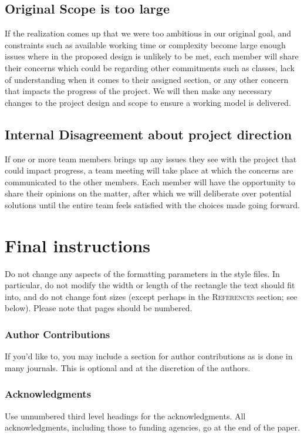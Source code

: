 \documentclass{article} %
\begin{document}
\subsection{Original Scope is too large}

If the realization comes up that we were too ambitious in our original goal, and constraints such as available working time or complexity become large enough issues where in the proposed design is unlikely to be met, each member will share their concerns which could be regarding other commitments such as classes, lack of understanding when it comes to their assigned section, or any other concern that impacts the progress of the project. We will then make any necessary changes to the project design and scope to ensure a working model is delivered.

\subsection{Internal Disagreement about project direction}

If one or more team members brings up any issues they see with the project that could impact progress, a team meeting will take place at which the concerns are communicated to the other members. Each member will have the opportunity to share their opinions on the matter, after which we will deliberate over potential solutions until the entire team feels satisfied with the choices made going forward.


\section{Final instructions}
Do not change any aspects of the formatting parameters in the style files.
In particular, do not modify the width or length of the rectangle the text
should fit into, and do not change font sizes (except perhaps in the
\textsc{References} section; see below). Please note that pages should be
numbered.


\subsubsection*{Author Contributions}
If you'd like to, you may include  a section for author contributions as is done
in many journals. This is optional and at the discretion of the authors.

\subsubsection*{Acknowledgments}
Use unnumbered third level headings for the acknowledgments. All
acknowledgments, including those to funding agencies, go at the end of the paper.

\label{last_page}



\end{document}
